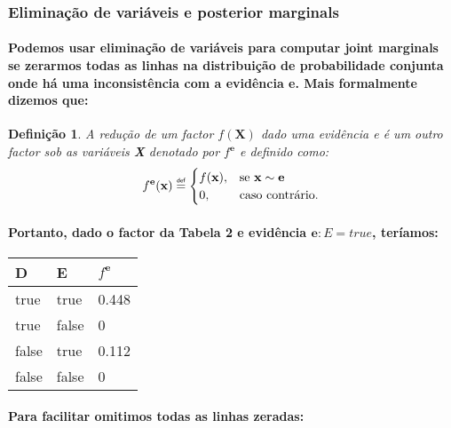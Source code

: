 \documentclass[a4paper,10pt]{article}
\newcommand\defeq{\mathrel{\overset{\makebox[0pt]{\mbox{\normalfont\tiny\sffamily def}}}{=}}}
\theoremstyle{plain}
\newtheorem*{spn-def}{Definição}
\begin{document}
\subsubsection{Eliminação de variáveis e posterior marginals}

\paragraph{
  Podemos usar eliminação de variáveis para computar joint marginals se zerarmos todas as linhas
  na distribuição de probabilidade conjunta onde há uma inconsistência\cite{report-2} com a
  evidência \textbf{e}. Mais formalmente dizemos que:
}

\begin{spn-def} A redução de um factor $f(\textbf{X})$ dado uma evidência \textit{e} é um outro
  factor sob as variáveis \textbf{X} denotado por $f^{\textbf{e}}$ e definido como:
  \begin{equation}
    f^{\textbf{e}}(\textbf{x}) \defeq
    \begin{cases}
      f(\textbf{x}), & \text{se $\textbf{x} \sim \textbf{e}$} \\
      0, & \text{caso contrário.} \\
    \end{cases}
  \end{equation}
\end{spn-def}

\paragraph{
  Portanto, dado o factor da Tabela 2 e evidência $\textbf{e}: E = true$, teríamos:
}

\begin{table}[h]
  \begin{center}
    \begin{tabular}{*{2}{l} | l}
      D & E & $f^\textbf{e}$ \\
      \hline
      true & true & 0.448 \\
      true & false & 0 \\
      false & true & 0.112 \\
      false & false & 0 \\
    \end{tabular}
  \end{center}
\end{table}

\newpage

\paragraph{
  Para facilitar omitimos todas as linhas zeradas:
}
\end{document}
